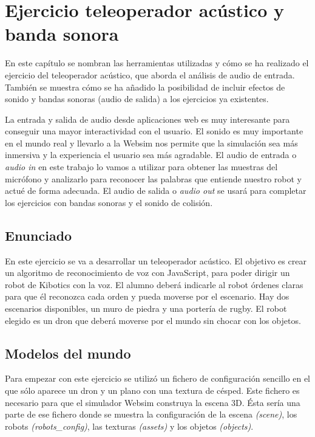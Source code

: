 \chapter{Ejercicio teleoperador acústico y banda sonora}\label{audio}
En este capítulo se nombran las herramientas utilizadas y cómo se ha realizado el ejercicio del teleoperador acústico, que aborda el análisis de audio de entrada. También se muestra cómo se ha añadido la posibilidad de incluir efectos de sonido y bandas sonoras (audio de salida) a los ejercicios ya existentes.

La entrada y salida de audio desde aplicaciones web es muy interesante para conseguir una mayor interactividad con el usuario. El sonido es muy importante en el mundo real y llevarlo a la Websim nos permite que la simulación sea más inmersiva y la experiencia el usuario sea más agradable.
 El audio de entrada o \textit{audio in} en este trabajo  lo vamos a utilizar para obtener las muestras del micrófono y analizarlo  para reconocer las palabras que entiende nuestro robot y  actué de forma adecuada. El audio de salida o \textit{audio out} se usará para completar los ejercicios con bandas sonoras y el sonido de colisión.

\section{Enunciado}  
En este ejercicio se va a desarrollar un teleoperador acústico. El objetivo es crear un algoritmo de reconocimiento de voz con JavaScript, para poder dirigir un robot de Kibotics con la voz.
El alumno deberá indicarle  al robot órdenes claras para que él reconozca cada orden  y pueda moverse por el escenario. Hay dos escenarios disponibles, un muro de piedra y una portería de rugby. El robot elegido es un dron que deberá moverse por el mundo sin chocar con los objetos.

\section{Modelos del mundo }
Para empezar con este ejercicio se utilizó un fichero de configuración sencillo en el que sólo aparece un dron y un plano con una textura de césped. Este fichero es necesario para que el simulador Websim construya la escena 3D. 
Ésta sería una parte de ese fichero donde se muestra la configuración de la escena \textit{(scene)}, los robots \textit {(robots\_config)}, las texturas \textit{(assets)} y los objetos \textit{(objects)}.

